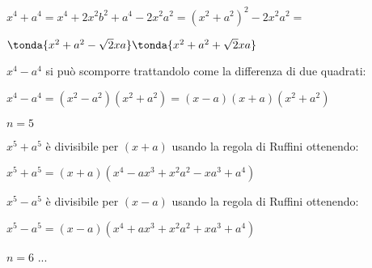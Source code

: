 \begin{itemize*}
\begin{itemize*}
   \(x^4+a^4 = x^4+2x^2b^2+a^4-2x^2a^2 = (x^2+a^2)^2-2x^2a^2=\)
   
   \(\tonda{x^2+a^2-\sqrt{2}xa}\tonda{x^2+a^2+\sqrt{2}xa}\)
   
  \item \(x^4-a^4\) si può scomporre trattandolo come la differenza di due 
   quadrati:
   
   \(x^4-a^4 = (x^2-a^2)(x^2+a^2) = (x-a)(x+a)(x^2+a^2) \)
 \end{itemize*}

 \item \(n=5\)
 \begin{itemize*}
  \item \(x^5+a^5\) è divisibile per \((x+a)\) usando la regola di Ruffini
   ottenendo: 
   
   \(x^5+a^5=(x+a)(x^4-ax^3+x^2a^2-xa^3+a^4)\)
   
  \item \(x^5-a^5\) è divisibile per \((x-a)\) usando la regola di Ruffini
   ottenendo: 
   
   \(x^5-a^5=(x-a)(x^4+ax^3+x^2a^2+xa^3+a^4)\)
   
 \end{itemize*}

 \item \(n=6\) ...
 
\end{itemize*}

%  
% 
% 
% 
%  
% 
% 
% 
% 
% 

